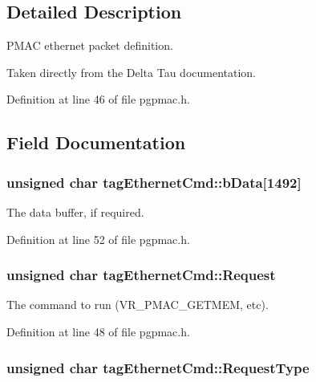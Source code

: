 \subsection{Detailed Description}
P\-M\-A\-C ethernet packet definition. 

Taken directly from the Delta Tau documentation. 

Definition at line 46 of file pgpmac.\-h.



\subsection{Field Documentation}
\hypertarget{structtagEthernetCmd_a872dab798127d6f589974a79c5d0aef1}{
\subsubsection[{b\-Data}]{\setlength{\rightskip}{0pt plus 5cm}unsigned char tag\-Ethernet\-Cmd\-::b\-Data\mbox{[}1492\mbox{]}}}\label{structtagEthernetCmd_a872dab798127d6f589974a79c5d0aef1}


The data buffer, if required. 



Definition at line 52 of file pgpmac.\-h.

\hypertarget{structtagEthernetCmd_a0dc566e7edbb226f1a4ea443d93d56e2}{
\subsubsection[{Request}]{\setlength{\rightskip}{0pt plus 5cm}unsigned char tag\-Ethernet\-Cmd\-::\-Request}}\label{structtagEthernetCmd_a0dc566e7edbb226f1a4ea443d93d56e2}


The command to run (V\-R\-\_\-\-P\-M\-A\-C\-\_\-\-G\-E\-T\-M\-E\-M, etc). 



Definition at line 48 of file pgpmac.\-h.

\hypertarget{structtagEthernetCmd_a6a155eb3ae546dd29369c4a33ddb3310}{
\subsubsection[{Request\-Type}]{\setlength{\rightskip}{0pt plus 5cm}unsigned char tag\-Ethernet\-Cmd\-::\-Request\-Type}}\label{structtagEthernetCmd_a6a155eb3ae546dd29369c4a33ddb3310}


